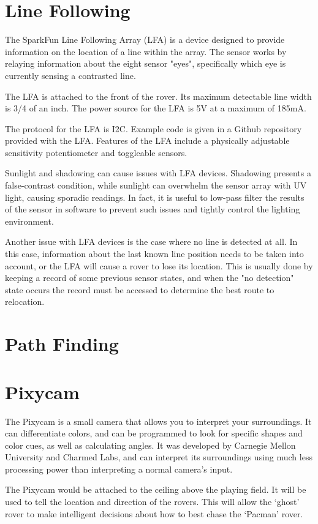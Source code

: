 \documentclass[12pt,letterpaper]{article}
\begin{document}
\section{Line Following}
The SparkFun Line Following Array (LFA) is a device designed to provide information on the location of a line within the array. The sensor works by relaying information about the eight sensor "eyes", specifically which eye is currently sensing a contrasted line. 

The LFA is attached to the front of the rover. Its maximum detectable line width is 3/4 of an inch. The power source for the LFA is 5V at a maximum of 185mA. 

The protocol for the LFA is I2C. Example code is given in a Github repository provided with the LFA. Features of the LFA include a physically adjustable sensitivity potentiometer and toggleable sensors. 

Sunlight and shadowing can cause issues with LFA devices. Shadowing presents a false-contrast condition, while sunlight can overwhelm the sensor array with UV light, causing sporadic readings. In fact, it is useful to low-pass filter the results of the sensor in software to prevent such issues and tightly control the lighting environment.

Another issue with LFA devices is the case where no line is detected at all. In this case, information about the last known line position needs to be taken into account, or the LFA will cause a rover to lose its location. This is usually done by keeping a record of some previous sensor states, and when the "no detection" state occurs the record must be accessed to determine the best route to relocation.

\section{Path Finding}

\section{Pixycam}
The Pixycam is a small camera that allows you to interpret your surroundings. It can differentiate colors, and can be programmed to look for specific shapes and color cues, as well as calculating angles. It was developed by Carnegie Mellon University and Charmed Labs, and can interpret its surroundings using much less processing power than interpreting a normal camera’s input. 

The Pixycam would be attached to the ceiling above the playing field. It will be used to tell the location and direction of the rovers. This will allow the ‘ghost’ rover to make intelligent decisions about how to best chase the ‘Pacman’ rover. 
\end{document}
